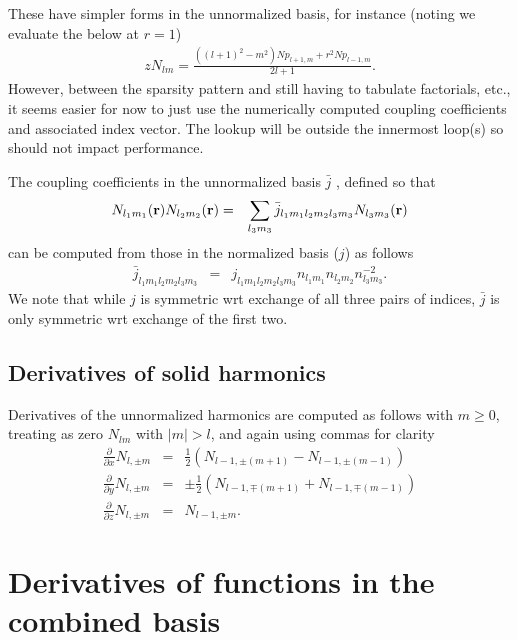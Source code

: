\documentclass[12pt]{article}
\newcommand{\rv}{\vb{r}}
\begin{document}
These have simpler forms in the unnormalized basis, for instance (noting we evaluate the below at $r=1$)
\begin{eqnarray}
z N_{lm} = \frac{\left(\left(l +1\right)^{2}-m^{2}\right) \mathit{Np}_{l +1,m}+r^{2} \mathit{Np}_{l -1,m}}{2 l +1} .
\end{eqnarray}
However, between the sparsity pattern and still having to tabulate factorials, etc.,  it seems easier for now to just use the numerically computed coupling coefficients and associated index vector.  The lookup will be outside the innermost loop(s) so should not impact performance.

The coupling coefficients in the unnormalized basis $\bar{j}$ , defined so that
\begin{eqnarray}
  N_{l_1 m_1}(\rv) N_{l_2 m_2}(\rv) & = & \sum_{l_3 m_3} \bar{j}_{l_1 m_1 l_2 m_2 l_3 m_3} N_{l_3 m_3}(\rv)  
\end{eqnarray}
can be computed from those in the normalized basis ($j$) as follows
\begin{eqnarray}
  \bar{j}_{l_1 m_1 l_2 m_2 l_3 m_3} & = & j_{l_1 m_1 l_2 m_2 l_3 m_3} n_{l_1 m_1} n_{l_2 m_2} n^{-2}_{l_3 m_3} .
\end{eqnarray}
We note that while $j$ is symmetric wrt exchange of all three pairs of indices, $\bar{j}$ is only symmetric wrt exchange of the first two.


\subsection{Derivatives of solid harmonics}
\label{sec:solder}

Derivatives of the unnormalized harmonics are computed as follows with $m\ge 0$, treating as zero $N_{lm}$ with $|m|>l$, and again using commas for clarity
\begin{eqnarray}
  \frac{\partial}{\partial x} N_{l,\pm m} & = & \frac{1}{2}\left( N_{l-1,\pm (m+1)} - N_{l-1,\pm (m-1)} \right) \nonumber \\
  \frac{\partial}{\partial y} N_{l,\pm m} & = & \pm \frac{1}{2}\left( N_{l-1,\mp (m+1)} + N_{l-1,\mp (m-1)} \right) \nonumber \\
  \frac{\partial}{\partial z} N_{l,\pm m} & = & N_{l-1,\pm m} . \nonumber
\end{eqnarray}

\section{Derivatives of functions in the combined basis}
\end{document}

